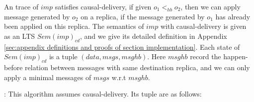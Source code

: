 An trace of $\mathit{imp}$ satisfies causal-delivery, if given $o_1 <_{\mathit{hb}} o_2$, then we can apply message generated by $o_2$ on a replica, if the message generated by $o_1$ has already been applied on this replica. The semantics of $\mathit{imp}$ with causal-delivery is given as an LTS $\mathit{Sem}(\mathit{imp})_{\mathit{cd}}$, and we give its detailed definition in Appendix \ref{sec:appendix definitions and proofs of section implementation}. Each state of $\mathit{Sem}(\mathit{imp})_{\mathit{cd}}$ is a tuple $(\mathit{data},\mathit{msgs},\mathit{msghb})$. {\color {red}Here $\mathit{msghb}$ record the happen-before relation between messages with same destination replica, and we can only apply a minimal messages of $\mathit{msgs}$ w.r.t $\mathit{msghb}$.} 




: This algorithm assumes causal-delivery. Its tuple are as follows: 

